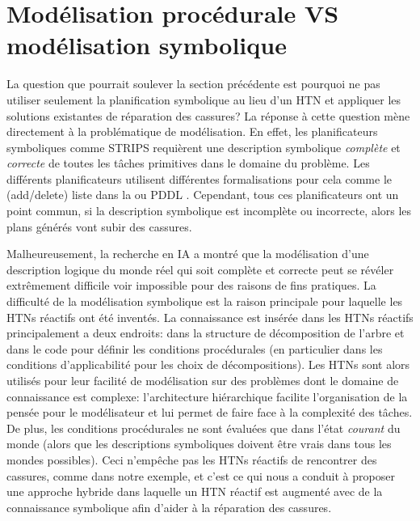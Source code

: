 \documentclass[a4paper,twoside,french]{article}
\begin{document}
		\section {Modélisation procédurale VS modélisation symbolique}
		La question que pourrait soulever la section précédente est pourquoi ne pas utiliser seulement la planification symbolique au lieu d'un HTN et appliquer les solutions existantes de réparation des cassures? La réponse à cette question mène directement à la problématique de modélisation. En effet, les planificateurs symboliques comme STRIPS requièrent une description symbolique {\em complète} et {\em correcte} de toutes les tâches primitives dans le domaine du problème. Les différents planificateurs utilisent différentes formalisations pour cela comme le (add/delete) liste dans la  ou PDDL \cite{ghallab1998pddl}. Cependant, tous ces planificateurs ont un point  commun, si la description symbolique est incomplète ou incorrecte, alors les plans générés vont subir des cassures. 
		\par Malheureusement, la recherche en IA a montré que la modélisation d'une description logique du monde réel qui soit complète et correcte  peut se révéler extrêmement difficile voir impossible  pour des raisons de fins pratiques.  La difficulté de la modélisation symbolique est la raison principale pour laquelle les HTNs réactifs ont été inventés. La connaissance est insérée dans les HTNs réactifs principalement a deux endroits: dans la structure de décomposition de l'arbre et dans le code pour définir les conditions procédurales (en particulier dans les conditions d'applicabilité pour les choix de décompositions). Les HTNs sont alors utilisés pour leur facilité de modélisation sur des problèmes dont le domaine de connaissance est complexe: l'architecture hiérarchique facilite l'organisation de la pensée pour le modélisateur et lui permet de faire face à la complexité des tâches. De plus, les conditions procédurales ne sont évaluées que dans l'état {\em courant} du monde (alors que les descriptions symboliques doivent être vrais dans tous les mondes possibles). Ceci n'empêche pas les HTNs réactifs de rencontrer des cassures, comme dans notre exemple, et c'est ce qui nous a conduit à proposer une approche hybride dans laquelle un HTN réactif est augmenté avec de la connaissance symbolique afin d'aider à la réparation des cassures. 
		
\end{document}
